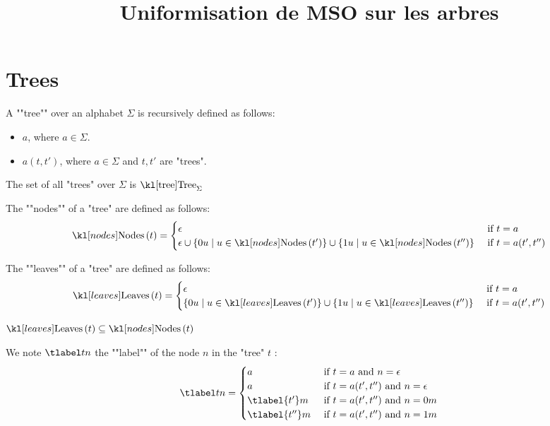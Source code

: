 \documentclass{article}
\begin{document}
\title{Uniformisation de MSO sur les arbres}

\maketitle

\section{Trees}


\begin{definition}[Tree]
	A ""tree"" over an alphabet $\Sigma$ is recursively defined as follows:
	\begin{itemize}
		\item $a$, where $a \in \Sigma$.
		\item $a(t,t')$, where $a \in \Sigma$ and $t, t'$ are "trees".
	\end{itemize}

	The set of all "trees" over $\Sigma$ is $\tree_{\Sigma}$
\end{definition}

\begin{definition}[Nodes]
	The ""nodes"" of a "tree" are defined as follows:
	\[
		\nodes t = \begin{cases}
			\epsilon                                & \text{ if } t = a         \\
			\epsilon \cup \setdef {0u} {u \in \nodes {t'}}
			\cup \setdef {1u} {u \in \nodes {t''} } & \text{ if } t = a(t',t'')
		\end{cases}
	\]
\end{definition}


\begin{definition}[Leaves]
	The ""leaves"" of a "tree" are defined as follows:
	\[
		\leaves t = \begin{cases}
			\epsilon                                 & \text{ if } t = a         \\
			\setdef {0u} {u \in \leaves {t'}}
			\cup \setdef {1u} {u \in \leaves {t''} } & \text{ if } t = a(t',t'')
		\end{cases}
	\]
\end{definition}

\begin{remark}
	$\leaves t \subseteq \nodes t$
\end{remark}

\begin{definition}
	We note $\tlabel t n$ the ""label"" of the node $n$ in the "tree" $t$ :
	\[
		\tlabel t n =   \begin{cases}
			a               & \text{ if } t = a \text{ and } n = \epsilon         \\
			a               & \text{ if } t = a(t',t'') \text{ and } n = \epsilon \\
			\tlabel {t'} m  & \text{ if } t = a(t',t'') \text{ and } n = 0m       \\
			\tlabel {t''} m & \text{ if } t = a(t',t'') \text{ and } n = 1m
		\end{cases}
	\]
\end{definition}
\end{document}
